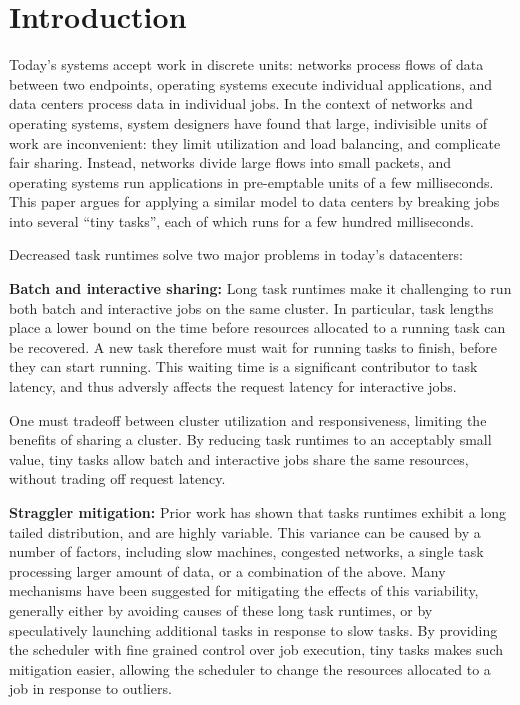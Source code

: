 \section{Introduction}
Today's systems accept work in discrete units: networks process flows of data
between two endpoints, operating systems execute individual applications, and
data centers process data in individual jobs.  In the context of networks and
operating systems, system designers have found that large, indivisible units of work are
inconvenient: they limit utilization and load balancing,
and complicate fair sharing.  Instead, networks divide large flows into small
packets, and operating systems run applications in pre-emptable units of a 
few milliseconds.  This paper argues for
applying a similar model to data centers by breaking jobs into
several ``tiny tasks'', each of which runs for a few hundred milliseconds.

Decreased task runtimes solve two major problems in today's datacenters:

\vspace{4pt}\noindent\textbf{Batch and interactive sharing:}
Long task runtimes make it challenging to run both batch and interactive
jobs on the same cluster. In particular, task lengths place a lower bound on
the time before resources allocated to a running task can be recovered. A new
task therefore must wait for running tasks to finish, before they can start running.
This waiting time is a significant contributor to task latency, and thus adversly
affects the request latency for interactive jobs.

One must tradeoff between
cluster utilization and responsiveness, limiting the benefits of sharing
a cluster. By reducing task runtimes to an acceptably small value, tiny
tasks allow batch and interactive jobs share the same resources, without
trading off request latency.

\vspace{4pt}\noindent\textbf{Straggler mitigation:}
Prior work has shown that tasks runtimes exhibit a long
tailed distribution, and are highly variable. This variance can be caused by
a number of factors, including slow machines, congested networks, a single task
processing larger amount of data, or a combination of the above.
Many mechanisms have been suggested for mitigating
the effects of this variability, generally either by avoiding causes of these
long task runtimes, or by speculatively launching additional tasks in response to slow tasks.
By providing the scheduler with fine grained control over job execution, tiny
tasks makes such mitigation easier, allowing the scheduler to change the resources
allocated to a job in response to outliers.\\


